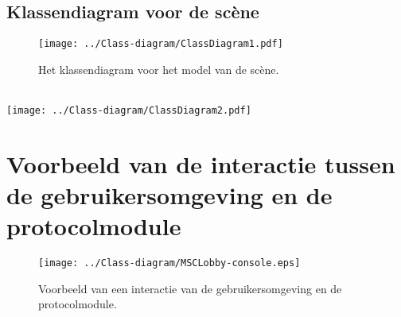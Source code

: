 \documentclass[a4paper,11pt, twoside]{article}
\begin{document}
    \subsection{Klassendiagram voor de sc\`ene}
    \begin{figure}[h]
        \centering
    	\texttt{[image: ../Class-diagram/ClassDiagram1.pdf]}
	\caption{Het klassendiagram voor het model van de sc\`ene.}
    \end{figure}

    \label{app:Scene}
    \FloatBarrier
    \newpage
     \ \\[5mm]
    \texttt{[image: ../Class-diagram/ClassDiagram2.pdf]}
    \newpage

    
    \newpage

    
    \newpage

    \section{Voorbeeld van de interactie tussen de gebruikersomgeving en de protocolmodule}
    \label{sec:interactscenmodel}
    \begin{figure}[h]
    	\centering
	\texttt{[image: ../Class-diagram/MSCLobby-console.eps]}
	\caption{Voorbeeld van een interactie van de gebruikersomgeving en de protocolmodule.}
    \end{figure}
    \label{app:MSCLobbyCon}
    \newpage

    
\end{document}
